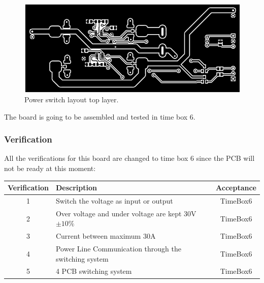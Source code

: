 \begin{figure}[H]
	\begin{centering}
		\includegraphics[width=1.0\textwidth]{images/tb5_layout_top.png}
		\caption{Power switch layout top layer.}
	\end{centering}
\end{figure}

The board is going to be assembled and tested in time box 6.

\subsubsection{Verification}
All the verifications for this board are changed to time box 6 since the PCB will not be ready at this moment:
\begin{table}[H]
\centering
	\begin{tabular}{| c | l | c |}
		\hline
		Verification & Description & Acceptance \\\hline
		1 & Switch the voltage as input or output & TimeBox6 \\\hline
		2 & Over voltage and under voltage are kept 30V $ \pm10\% $ & TimeBox6 \\\hline
		3 & Current between maximum 30A & TimeBox6 \\\hline
		4 & Power Line Communication through the switching system & TimeBox6 \\\hline
		5 & 4 PCB switching system & TimeBox6 \\\hline
	\end{tabular}
\end{table}
%
%
